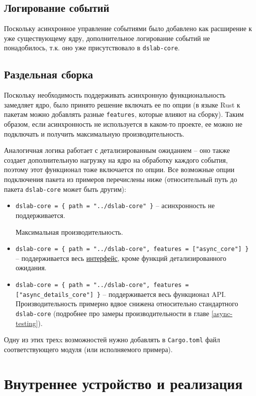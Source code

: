 \subsection{Логирование событий}

Поскольку асинхронное управление событиями было добавлено как расширение к уже существующему ядру, дополнительное логирование событий не понадобилось, т.к. оно уже присутствовало в \texttt{dslab-core}.

\subsection{Раздельная сборка}

Поскольку необходимость поддерживать асинхронную функциональность замедляет ядро, было принято решение включать ее по опции (в языке Rust к пакетам можно добавлять разные \texttt{features}, которые влияют на сборку). Таким образом, если асинхронность не используется в каком-то проекте, ее можно не подключать и получить максимальную производительность. 

Аналогичная логика работает с детализированным ожиданием -- оно также создает дополнительную нагрузку на ядро на обработку каждого события, поэтому этот функционал тоже включается по опции. Все возможные опции подключения пакета из примеров перечислены ниже (относительный путь до пакета \texttt{dslab-core} может быть другим): 
\begin{itemize}
    \item \small \texttt{dslab-core = \{ path = "../dslab-core" \}} -- асинхронность не поддерживается. 
    
    Максимальная производительность. 
    \item \small \texttt{dslab-core = \{ path = "../dslab-core", features = ["async\_core"] \} } -- поддерживается весь \hyperref[interface]{интерфейс}, кроме функций детализированного ожидания. 
    \item \small \texttt{dslab-core = \{ path = "../dslab-core",   features = ["async\_details\_core"] \}} -- поддерживается весь функционал API. Производительность примерно вдвое снижена относительно стандартного \texttt{dslab-core} (подробнее про замеры производительности в главе \ref{async-testing}).
\end{itemize}
Одну из этих трехx возможностей нужно добавлять в \texttt{Cargo.toml} файл соответствующего модуля (или исполняемого примера).


\newpage 
\section{Внутреннее устройство и реализация}\label{inner}

